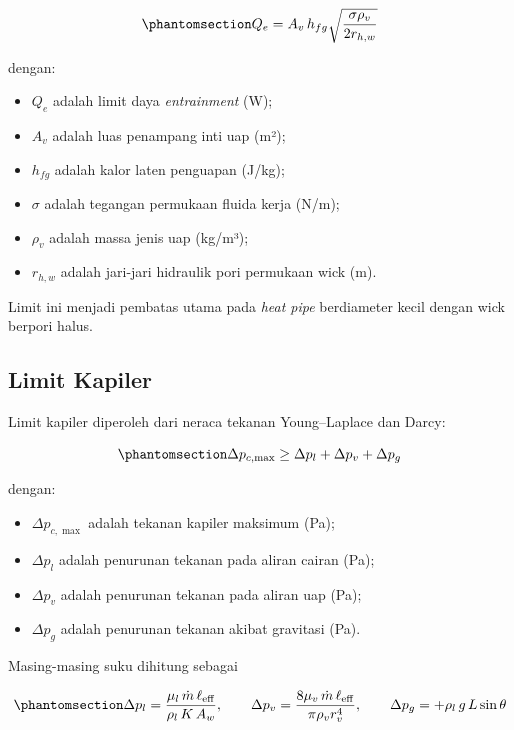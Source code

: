 \documentclass[
  indonesian,
  12pt,
  a4paper,
]{report}
\providecommand{\tightlist}{%
  \setlength{\itemsep}{0pt}\setlength{\parskip}{0pt}}
\begin{document}
\begin{equation}\protect\phantomsection\label{eq-entrainment}{ Q_e = A_v\,h_{fg}\sqrt{\frac{\sigma\rho_v}{2r_{h,w}}}
   }\end{equation}

dengan:

\begin{itemize}
\tightlist
\item
  \(Q_e\) adalah limit daya \emph{entrainment} (W);
\item
  \(A_v\) adalah luas penampang inti uap (m²);
\item
  \(h_{fg}\) adalah kalor laten penguapan (J/kg);
\item
  \(\sigma\) adalah tegangan permukaan fluida kerja (N/m);
\item
  \(\rho_v\) adalah massa jenis uap (kg/m³);
\item
  \(r_{h,w}\) adalah jari-jari hidraulik pori permukaan wick (m).
\end{itemize}

Limit ini menjadi pembatas utama pada \emph{heat pipe} berdiameter kecil
dengan wick berpori halus.

\subsection{Limit Kapiler}\label{limit-kapiler}

Limit kapiler diperoleh dari neraca tekanan Young--Laplace dan Darcy:

\begin{equation}\protect\phantomsection\label{eq-capillary-limit}{ \Delta p_{c,\max} \ge \Delta p_l + \Delta p_v + \Delta p_g
   }\end{equation}

dengan:

\begin{itemize}
\tightlist
\item
  \(\Delta p_{c,\max}\) adalah tekanan kapiler maksimum (Pa);
\item
  \(\Delta p_l\) adalah penurunan tekanan pada aliran cairan (Pa);
\item
  \(\Delta p_v\) adalah penurunan tekanan pada aliran uap (Pa);
\item
  \(\Delta p_g\) adalah penurunan tekanan akibat gravitasi (Pa).
\end{itemize}

Masing-masing suku dihitung sebagai

\begin{equation}\protect\phantomsection\label{eq-dp}{ \Delta p_l = \frac{\mu_l\,\dot{m}\,\ell_{\mathrm{eff}}}
                     {\rho_l\,K\,A_w}, \qquad
   \Delta p_v = \frac{8\mu_v\,\dot{m}\,\ell_{\mathrm{eff}}}
                     {\pi\rho_v r_v^4}, \qquad
   \Delta p_g = +\rho_l\,g\,L\sin\theta }\end{equation}
\end{document}
